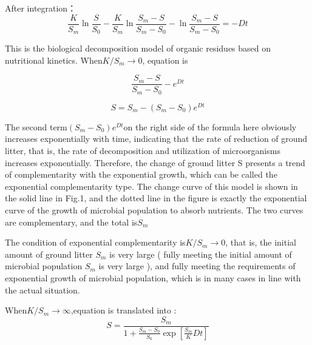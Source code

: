 \documentclass{mcmthesis}
\begin{document}
After integration：$$\frac{K}{S_{m}} \ln \frac{S}{S_{0}}-\frac{K}{S_{m}} \ln \frac{S_{m}-S}{S_{m}-S_{0}}-\ln \frac{S_{m}-S}{S_{m}-S_{0}}=-D t$$

This is the biological decomposition model of organic residues based on nutritional kinetics.
When$K / S_{m} \rightarrow 0$, equation is

$$\frac{S_{m}-S}{S_{m}-S_{0}}-e^{D t}$$

$$S=S_{m}-\left(S_{m}-S_{0}\right) e^{D t}$$

The second term$\left({S}_{m}-S_{0}\right) e^{D t}$on the right side of the formula here obviously increases exponentially with time, indicating that the rate of reduction of ground litter, that is, the rate of decomposition and utilization of microorganisms increases exponentially. Therefore, the change of ground litter S presents a trend of complementarity with the exponential growth, which can be called the exponential complementarity type. The change curve of this model is shown in the solid line in Fig.1, and the dotted line in the figure is exactly the exponential curve of the growth of microbial population to absorb nutrients. The two curves are complementary, and the total is$S_m$



The condition of exponential complementarity is$K/S_m→0$, that is, the initial amount of ground litter $S_m$ is very large ( fully meeting the initial amount of microbial population $S_m$ is very large ), and fully meeting the requirements of exponential growth of microbial population, which is in many cases in line with the actual situation.

When$K / S_{m} \rightarrow \infty$,equation is translated into :
$$S=\frac{S_{m}}{1+\frac{S_{m}-S_{0}}{S_{0}} \exp \left[\frac{S_{m}}{K} D t\right]}$$
\end{document}
